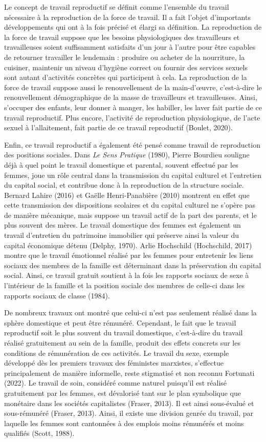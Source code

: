 \documentclass[
  12pt,
]{book}
\begin{document}
Le concept de travail reproductif se définit comme l'ensemble du travail
nécessaire à la reproduction de la force de travail. Il a fait l'objet
d'importants développements qui ont à la fois précisé et élargi sa
définition. La reproduction de la force de travail suppose que les
besoins physiologiques des travailleurs et travailleuses soient
suffisamment satisfaits d'un jour à l'autre pour être capables de
retourner travailler le lendemain : produire ou acheter de la
nourriture, la cuisiner, maintenir un niveau d'hygiène correct ou
fournir des services sexuels sont autant d'activités concrètes qui
participent à cela. La reproduction de la force de travail suppose aussi
le renouvellement de la main-d'œuvre, c'est-à-dire le renouvellement
démographique de la masse de travailleurs et travailleuses. Ainsi,
s'occuper des enfants, leur donner à manger, les habiller, les laver
fait partie de ce travail reproductif. Plus encore, l'activité de
reproduction physiologique, de l'acte sexuel à l'allaitement, fait
partie de ce travail reproductif (Boulet, 2020).

Enfin, ce travail reproductif a également été pensé comme travail de
reproduction des positions sociales. Dans \emph{Le Sens Pratique}
(1980), Pierre Bourdieu souligne déjà à quel point le travail domestique
et parental, souvent effectué par les femmes, joue un rôle central dans
la transmission du capital culturel et l'entretien du capital social, et
contribue donc à la reproduction de la structure sociale. Bernard Lahire
(2016) et Gaëlle Henri-Panabière (2010) montrent en effet que cette
transmission des dispositions scolaires et du capital culturel ne
s'opère pas de manière mécanique, mais suppose un travail actif de la
part des parents, et le plus souvent des mères. Le travail domestique
des femmes est également un travail d'entretien du patrimoine immobilier
qui préserve ainsi la valeur du capital économique détenu (Delphy,
1970). Arlie Hochschild (Hochschild, 2017) montre que le travail
émotionnel réalisé par les femmes pour entretenir les liens sociaux des
membres de la famille est déterminant dans la préservation du capital
social. Ainsi, ce travail gratuit soutient à la fois les rapports
sociaux de sexe à l'intérieur de la famille et la position sociale des
membres de celle-ci dans les rapports sociaux de classe (1984).

De nombreux travaux ont montré que celui-ci n'est pas seulement réalisé
dans la sphère domestique et peut être rémunéré. Cependant, le fait que
le travail reproductif soit le plus souvent du travail domestique,
c'est-à-dire du travail réalisé gratuitement au sein de la famille,
produit des effets concrets sur les conditions de rémunération de ces
activités. Le travail du sexe, exemple développé dès les premiers
travaux des féministes marxistes, s'effectue principalement de manière
informelle, reste stigmatisé et non reconnu Fortunati (2022). Le travail
de soin, considéré comme naturel puisqu'il est réalisé gratuitement par
les femmes, est dévalorisé tant sur le plan symbolique que monétaire
dans les sociétés capitalistes (Fraser, 2013). Il est ainsi sous-évalué
et sous-rémunéré (Fraser, 2013). Ainsi, il existe une division genrée du
travail, par laquelle les femmes sont cantonnées à des emplois moins
rémunérés et moins qualifiés (Scott, 1988).
\end{document}

